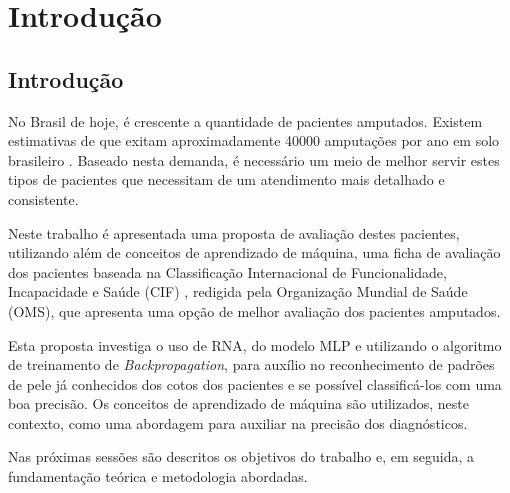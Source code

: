 \part{Introdução}
\chapter[Introdução]{Introdução}

No Brasil de hoje, é crescente a quantidade de pacientes amputados. Existem estimativas de que exitam aproximadamente 40000 amputações por ano em solo brasileiro \cite{Reis2011}. Baseado nesta demanda, é necessário um meio de melhor servir estes tipos de pacientes que necessitam de um atendimento mais detalhado e consistente.

Neste trabalho é apresentada uma proposta de avaliação destes pacientes,  utilizando além de conceitos de aprendizado de máquina, uma ficha de avaliação dos pacientes baseada na Classificação Internacional de Funcionalidade, Incapacidade e Saúde (CIF) \cite{OMS2004}, redigida pela Organização Mundial de Saúde (OMS), que apresenta uma opção de melhor avaliação dos pacientes amputados.

Esta proposta investiga o uso de RNA, do modelo MLP e utilizando o algoritmo de treinamento de \textit{Backpropagation}, para auxílio no reconhecimento de padrões de pele já conhecidos dos cotos dos pacientes e se possível classificá-los com uma boa precisão. Os conceitos de aprendizado de máquina são utilizados, neste contexto, como uma abordagem para auxiliar na precisão dos diagnósticos.

Nas próximas sessões são descritos os objetivos do trabalho e, em seguida, a fundamentação teórica e metodologia abordadas.
